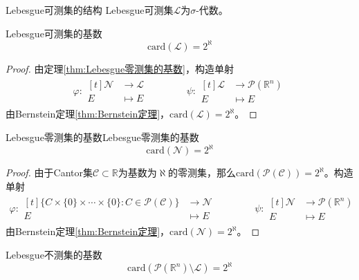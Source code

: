 \documentclass[lang = cn, scheme = chinese, thmcnt = section]{elegantbook}
\newcommand{\R}{\mathbb{R}}            %
\newcommand{\sub}{\subset}             %
\newcommand{\card}{\mathrm{card}}
\begin{document}
\begin{theorem}{Lebesgue可测集的结构}
	Lebesgue可测集$\mathscr{L}$为$\sigma$-代数。
\end{theorem}

\begin{theorem}{Lebesgue可测集的基数}
	$$\text{card}(\mathscr{L})=2^{\aleph}$$
\end{theorem}

\begin{proof}
	由定理\ref{thm:Lebesgue零测集的基数}，构造单射
	\begin{align*}
		\varphi:\begin{aligned}[t]
			\mathscr{N} &\longrightarrow \mathscr{L}\\
			E&\longmapsto E
		\end{aligned}
		\qquad\qquad
		\psi:\begin{aligned}[t]
			\mathscr{L} &\longrightarrow \mathscr{P}(\R^n)\\
			E &\longmapsto E
		\end{aligned}
	\end{align*}
	由Bernstein定理\ref{thm:Bernstein定理}，$\text{card}(\mathscr{L})=2^{\aleph}$。
\end{proof}

\begin{theorem}{Lebesgue零测集的基数}{Lebesgue零测集的基数}
	$$\text{card}(\mathscr{N})=2^{\aleph}$$
\end{theorem}

\begin{proof}
	由于Cantor集$\mathcal{C}\sub\R$为基数为$\aleph$的零测集，那么$\card(\mathscr{P}(\mathcal{C}))=2^{\aleph}$。构造单射
	\begin{align*}
		\varphi:\begin{aligned}[t]
			 \{ C\times\{0\}\times\cdots\times\{0\}:C\in \mathscr{P}(\mathcal{C}) \}&\longrightarrow \mathscr{N}\\
			 E&\longmapsto E
		\end{aligned}
		\qquad\qquad
		\psi:\begin{aligned}[t]
			\mathscr{N} &\longrightarrow \mathscr{P}(\R^n)\\
			E &\longmapsto E
		\end{aligned}
	\end{align*}
	由Bernstein定理\ref{thm:Bernstein定理}，$\text{card}(\mathscr{N})=2^{\aleph}$。
\end{proof}

\begin{theorem}{Lebesgue不测集的基数}
	$$\text{card}(\mathscr{P}(\R^n)\setminus\mathscr{L})=2^{\aleph}$$
\end{theorem}
\end{document}
